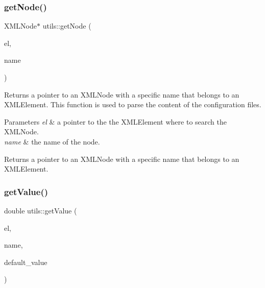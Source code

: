 \subsubsection{\texorpdfstring{getNode()}{getNode()}}
{\footnotesize\ttfamily X\+M\+L\+Node$\ast$ utils\+::get\+Node (\begin{DoxyParamCaption}\item[{X\+M\+L\+Element $\ast$}]{el,  }\item[{const char $\ast$}]{name }\end{DoxyParamCaption})}

Returns a pointer to an X\+M\+L\+Node with a specific name that belongs to an X\+M\+L\+Element. This function is used to parse the content of the configuration files. 
\begin{DoxyParams}{Parameters}
{\em el} & a pointer to the the X\+M\+L\+Element where to search the X\+M\+L\+Node. \\
\hline
{\em name} & the name of the node. \\
\hline
\end{DoxyParams}
\begin{DoxyReturn}{Returns}
a pointer to an X\+M\+L\+Node with a specific name that belongs to an X\+M\+L\+Element. 
\end{DoxyReturn}
\mbox{\label{namespaceutils_a90cdccb9260004c67a61003d648b4e14}} 
\subsubsection{\texorpdfstring{getValue()}{getValue()}\hspace{0.1cm}{\footnotesize\ttfamily [1/5]}}
{\footnotesize\ttfamily double utils\+::get\+Value (\begin{DoxyParamCaption}\item[{X\+M\+L\+Element $\ast$}]{el,  }\item[{const char $\ast$}]{name,  }\item[{double}]{default\+\_\+value }\end{DoxyParamCaption})}

